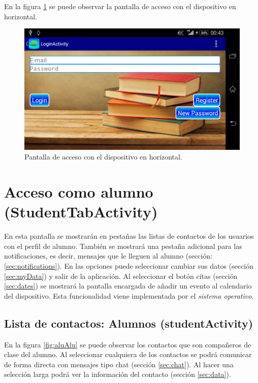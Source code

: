 		\bigskip
		En la figura \ref{fig:loginLand} se puede observar la pantalla de acceso con el dispositivo en horizontal.
		
		\begin{figure}[h !]
			\centering
			\includegraphics[scale=0.2]{Imagenes/App/loginLand}
			\caption{Pantalla de acceso con el dispositivo en horizontal.}
			\label{fig:loginLand}
		\end{figure}
		
	\section{Acceso como alumno (StudentTabActivity)}
		
		En esta pantalla se mostrarán en pestañas las listas de contactos de los usuarios con el perfil de alumno. También se mostrará una pestaña adicional para las notificaciones, es decir, mensajes que le lleguen al alumno (sección: \ref{sec:notifications}). En las opciones puede seleccionar cambiar sus datos (sección \ref{sec:myData}) y salir de la aplicación.
		Al seleccionar el botón citas (sección \ref{sec:dates}) se mostrará la pantalla encargada de añadir un evento al calendario del dispositivo. Esta funcionalidad viene implementada por el {\it sistema operativo}.
		
		\subsection{Lista de contactos: Alumnos (studentActivity)}
			
			En la figura \ref{fig:aluAlu} se puede observar los contactos que son compañeros de clase del alumno. Al seleccionar cualquiera de los contactos se podrá comunicar de forma directa con mensajes tipo chat (sección \ref{sec:chat}). Al hacer una selección larga podrá ver la información del contacto (sección \ref{sec:data}).
			
